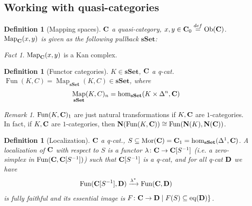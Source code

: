 \documentclass[A4paper, british]{amsart}
\theoremstyle{darkgreentheorem}
\theoremstyle{darkbluedefinition}
\newtheorem{defn}[thm]{Definition}
\theoremstyle{darkredexample}
\theoremstyle{remark}
\newtheorem{rem}[thm]{Remark}
\newtheorem{fact}[thm]{Fact}
\DeclareMathOperator{\Fun}{Fun}
\DeclareMathOperator{\Ob}{Ob}
\DeclareMathOperator{\Map}{Map}
\newcommand{\sSet}{\mathbf{sSet}}
\newcommand{\1}{\mathbbm{1}}
\newcommand{\sub}{\subseteq}
\begin{document}
\subsection{Working with quasi-categories}

\begin{defn}[Mapping spaces]
    $\mathbf{C}$ a quasi-category, $x,y\in \bfC_{0}\overset{def}{=}\Ob(\bfC)$.
    $\Map_{\bfC}(x,y)$ is given as the following pullback $\sSet$:
    \begin{center}
    \end{center}
\end{defn}

\begin{fact}
    $\Map_{\bfC}(x,y)$ is a Kan complex.
\end{fact}

\begin{defn}[Functor categories]
    $K\in \sSet$, $\mathbf{C}$ a q-cat.
    $\Fun(K,C)=\Map_{\sSet}(K,C)\in \sSet$, where
    \[ \Map_{\sSet}(K,C)_{n}=\operatorname{hom}_{\sSet}(K\times \Delta^{n},\bfC) \]
\end{defn}

\begin{rem}
    $\Fun(K,\bfC)_{1}$ are just natural transformations if $K,\mathbf{C}$ are $1$-categories.
    In fact, if $K,\mathbf{C}$ are $1$-categories, then $\bfN(\Fun(K,\bfC))\cong \Fun(\bfN(K),\bfN(\bfC))$.
\end{rem}

\begin{defn}[Localization]
    $\mathbf{C}$ a q-cat., $S\subseteq \operatorname{Mor}(\bfC)=\bfC_{1}=\operatorname{hom}_{\sSet}(\Delta^{1},\bfC)$.
    A \textit{localization} of $\mathbf{C}$ with respect to $S$ is a functor $\lambda\colon \mathbf{C}\to \mathbf{C}[S^{-1}]$ (i.e. a zero-simplex in $\Fun(\bfC,\bfC[S^{-1}])$) such that $\mathbf{C}[S^{-1}]$ is a q-cat, and for all q-cat $\mathbf{D}$ we have
    \[ \Fun(\bfC[S^{-1}],\D)\xrightarrow{\lambda^{*}} \Fun(\bfC,\D) \]
    is fully faithful and its essential image is $F\colon \bfC\to \D \mid F(S)\sub \operatorname{eq}(\D)\}$.
\end{defn}
\end{document}
